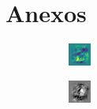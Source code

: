 \documentclass[journal]{IEEEtran}
\begin{document}
\section*{Anexos}


\begin{figure}[h]
    \centering
    \begin{subfigure}[b]{0.2\textwidth}
        \includegraphics[width=\textwidth]{1}
    \end{subfigure}
    \begin{subfigure}[b]{0.2\textwidth}
        \includegraphics[width=\textwidth]{5}

\end{subfigure}
\end{figure}
\end{document}
